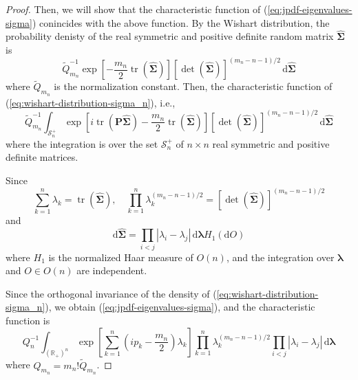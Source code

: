 \begin{proof}
    Then, we will show that the characteristic function of (\ref{eq:jpdf-eigenvalues-sigma}) conincides with the above function. By the Wishart distribution, the probability denisty of the real symmetric and positive definite random matrix $\widehat{\boldsymbol{\Sigma}}$ is
    \begin{equation}
        \widetilde{Q}_{m_{n}}^{-1}\exp\left[-\frac{m_{n}}{2}\operatorname{tr}\left(\widehat{\boldsymbol{\Sigma}}\right)\right]\left[\operatorname{det}\left(\widehat{\boldsymbol{\Sigma}}\right)\right]^{(m_{n}-n-1)/2}\,\mathrm{d}\widehat{\boldsymbol{\Sigma}}
        \label{eq:wishart-distribution-sigma_n}
    \end{equation}
    where $\widetilde{Q}_{m_{n}}$ is the normalization constant. Then, the characteristic function of (\ref{eq:wishart-distribution-sigma_n}), i.e.,
    \begin{equation*}
        \widetilde{Q}_{m_{n}}^{-1}\int_{\mathcal{S}_{n}^{+}}\exp\left[i\operatorname{tr}\left(\mathbf{P}\widehat{\boldsymbol{\Sigma}}\right)-\frac{m_{n}}{2}\operatorname{tr}\left(\widehat{\boldsymbol{\Sigma}}\right)\right]\left[\operatorname{det}\left(\widehat{\boldsymbol{\Sigma}}\right)\right]^{(m_{n}-n-1)/2}\,\mathrm{d}\widehat{\boldsymbol{\Sigma}}
    \end{equation*}
    where the integration is over the set $\mathcal{S}_{n}^{+}$ of $n\times n$ real symmetric and positive definite matrices.

    Since
    \begin{equation*}
        \sum_{k=1}^{n}\lambda_{k}=\operatorname{tr}\left(\widehat{\boldsymbol{\Sigma}}\right),\quad\prod_{k=1}^{n}\lambda_{k}^{(m_{n}-n-1)/2}=\left[\operatorname{det}\left(\widehat{\boldsymbol{\Sigma}}\right)\right]^{(m_{n}-n-1)/2}
    \end{equation*}
    and
    \begin{equation*}
        \mathrm{d}\widehat{\boldsymbol{\Sigma}}=\prod_{i<j}\left|\lambda_{i}-\lambda_{j}\right|\,\mathrm{d}\boldsymbol{\lambda}H_{1}\left(\mathrm{d}O\right)
    \end{equation*}
    where $H_{1}$ is the normalized Haar measure of $O(n)$, and the integration over $\boldsymbol{\lambda}$ and $O\in O(n)$ are independent.

    Since the orthogonal invariance of the density of (\ref{eq:wishart-distribution-sigma_n}), we obtain (\ref{eq:jpdf-eigenvalues-sigma}), and the characteristic function is
    \begin{equation}
        Q_{n}^{-1}\int_{\left(\mathbb{R}_{+}\right)^{n}}\exp\left[\sum_{k=1}^{n}\left(i p_{k}-\frac{m_{n}}{2}\right)\lambda_{k}\right]\prod_{k=1}^{n}\lambda_{k}^{(m_{n}-n-1)/2}\prod_{i<j}\left|\lambda_{i}-\lambda_{j}\right|\,\mathrm{d}\boldsymbol{\lambda}
        \label{eq:characteristic-function-wishart}
    \end{equation}
    where $Q_{m_{n}}=m_{n}!\widetilde{Q}_{m_{n}}$.


\end{proof}
